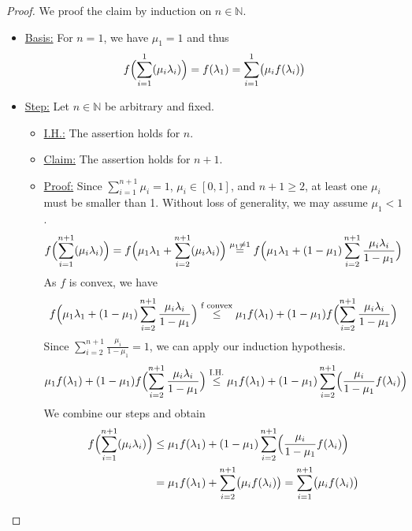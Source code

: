 \begin{proof}
We proof the claim by induction on $n\in\mathbb{N}$.
\begin{itemize}
\item\underline{Basis:} For $n=1$, we have $\mu_1=1$ and thus
\begin{equation*}
	f\Bigl(\sum\limits_{i=1}^1(\mu_i\lambda_i)\Bigr)=f(\lambda_1)=\sum\limits_{i=1}^1\bigl(\mu_if(\lambda_i)\bigr)
\end{equation*}
\item\underline{Step:} Let $n\in\mathbb{N}$ be arbitrary and fixed.
\begin{itemize}
	\item\underline{I.H.:} The assertion holds for $n$.
	\item\underline{Claim:} The assertion holds for $n+1$.
	\item\underline{Proof:} Since $\sum\limits_{i=1}^{n+1}\mu_i=1$, $\mu_i\in[0,1]$, and $n+1\ge 2$, at least one $\mu_i$ must be smaller than 1. Without loss of generality, we may assume $\mu_1<1$.
	\begin{equation*}
		f\Bigl(\sum\limits_{i=1}^{n+1}(\mu_i\lambda_i)\Bigr)=f\Bigl(\mu_1\lambda_1+\sum\limits_{i=2}^{n+1}(\mu_i\lambda_i)\Bigr)\stackrel{\mu_1\neq1}{=}f\Bigl(\mu_1\lambda_1+(1-\mu_1)\sum\limits_{i=2}^{n+1}\frac{\mu_i\lambda_i}{1-\mu_1}\Bigr)
	\end{equation*}
	As $f$ is convex, we have
	\begin{equation*}
		f\Bigl(\mu_1\lambda_1+(1-\mu_1)\sum\limits_{i=2}^{n+1}\frac{\mu_i\lambda_i}{1-\mu_1}\Bigr)\stackrel{\text{f convex}}{\le} \mu_1f(\lambda_1)+(1-\mu_1)f\Bigl(\sum\limits_{i=2}^{n+1}\frac{\mu_i\lambda_i}{1-\mu_1}\Bigr)
	\end{equation*}
	Since $\sum\limits_{i=2}^{n+1}\frac{\mu_i}{1-\mu_1}=1$, we can apply our induction hypothesis.
	\begin{equation*}
		\mu_1f(\lambda_1)+(1-\mu_1)f\Bigl(\sum\limits_{i=2}^{n+1}\frac{\mu_i\lambda_i}{1-\mu_1}\Bigr)\stackrel{\text{I.H.}}{\le} \mu_1f(\lambda_1)+(1-\mu_1)\sum\limits_{i=2}^{n+1}\Bigl(\frac{\mu_i}{1-\mu_1}f(\lambda_i)\Bigr)
	\end{equation*}
	We combine our steps and obtain
	\begin{align*}
		f\Bigl(\sum\limits_{i=1}^{n+1}(\mu_i\lambda_i)\Bigr)&\le \mu_1f(\lambda_1)+(1-\mu_1)\sum\limits_{i=2}^{n+1}\Bigl(\frac{\mu_i}{1-\mu_1}f(\lambda_i)\Bigr)\\
		&=\mu_1f(\lambda_1)+\sum\limits_{i=2}^{n+1}\bigl(\mu_if(\lambda_i)\bigr)=\sum_{i=1}^{n+1}\bigl(\mu_i f(\lambda_i)\bigr)\qedhere
	\end{align*}
\end{itemize}
\end{itemize}
\end{proof}
